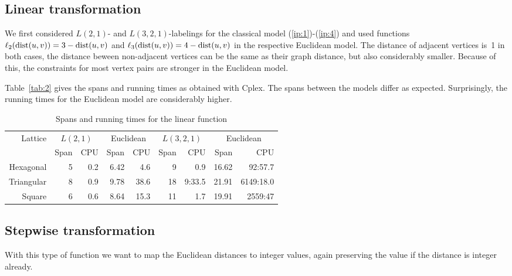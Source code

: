 \documentclass[smallextended]{svjour3}
\def\dist{\mathop{\rm dist}}
\begin{document}
\subsection{Linear transformation} 

We first considered $L(2,1)$- and $L(3,2,1)$-labelings for the classical model (\ref{ip:1})-(\ref{ip:4}) and used functions $\ell_{2}(\dist(u,v))=3-\dist(u,v)$ and $\ell_{3}(\dist(u,v))=4-\dist(u,v)$ 
in the respective Euclidean model. 
The distance of adjacent vertices is~1 in both cases, 
the distance beween non-adjacent vertices can be the same as their graph distance, 
but also considerably smaller. Because of this, the constraints for most vertex 
pairs are stronger in the Euclidean model. 

\noindent 
Table~\ref{tab:2} gives the spans and running times as obtained with Cplex. 
The spans between the models differ as expected. 
Surprisingly, the running times for the Euclidean model are considerably higher. 

\begin{table}[h] 
\begin{center} 
\renewcommand{\arraystretch}{1.3} 
\renewcommand{\tabcolsep}{8pt} 
\begin{tabular}{|r||r|r|r|r||r|r|r|r|} 
\hline 
Lattice  & \multicolumn{2}{c|}{$L(2,1)$} & \multicolumn{2}{c||}{Euclidean} & 
 \multicolumn{2}{c|}{$L(3,2,1)$} & \multicolumn{2}{c|}{Euclidean}\\ 
  & Span & CPU & Span & CPU & Span & CPU & Span & CPU\\ 
\hline 
Hexagonal   & 5 & 0.2 & 6.42 & 4.6 & 9 & 0.9& 16.62 & 92:57.7 \\ 
\hline 
Triangular  & 8 & 0.9 & 9.78 & 38.6 & 18 & 9:33.5& 21.91 & 6149:18.0 \\ 
\hline 
Square     & 6 & 0.6 & 8.64  & 15.3 & 11 & 1.7 & 19.91 & 2559:47  \\ 
\hline 
\end{tabular} 
\end{center} 
\caption{Spans and running times for the linear function} 
\label{tab:1} 
\end{table} 

\subsection{Stepwise transformation} 

With this type of function we want to map the Euclidean distances to integer 
values, again preserving the value if the distance is integer already. 
\end{document}
